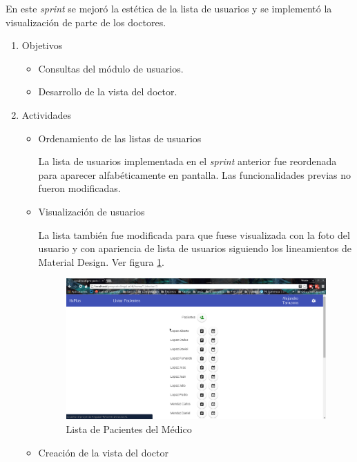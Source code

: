     En este \textit{sprint} se mejoró la estética de la lista de usuarios y se implementó la visualización de parte de los doctores.
    
    \begin{enumerate}
        \item Objetivos
        \begin{itemize}
            \item Consultas del módulo de usuarios.
            \item Desarrollo de la vista del doctor.
        \end{itemize}
        \item Actividades
        \begin{itemize}
            \item Ordenamiento de las listas de usuarios
            
            La lista de usuarios implementada en el \textit{sprint} anterior fue reordenada para aparecer alfabéticamente en pantalla. Las funcionalidades previas no fueron modificadas.
            
            \item Visualización de usuarios
            
            La lista también fue modificada para que fuese visualizada con la foto del usuario y con apariencia de lista de usuarios siguiendo los lineamientos de Material Design. Ver figura \ref{Pacientes}.
            
            \begin{figure}[htbp!]
                \begin{center}
                    \includegraphics[width=.8\textwidth]{figures/p6}
                \end{center}
                \caption{\label{Pacientes}Lista de Pacientes del Médico}
            \end{figure}
            
            \item Creación de la vista del doctor
            

\end{itemize}
\end{enumerate}
